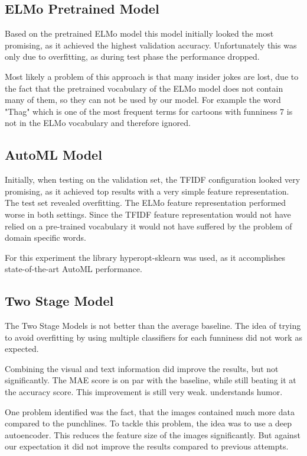 \documentclass[draft,final,oneside]{vutinfth} %
\begin{document}
\subsection{ELMo Pretrained Model}

Based on the pretrained ELMo model this model initially looked the most promising, as it
achieved the highest validation accuracy. Unfortunately this was only due to overfitting,
as during test phase the performance dropped.

Most likely a problem of this approach is that many insider jokes are lost, due to the fact
that the pretrained vocabulary of the ELMo model does not contain many of them, so
they can not be used by our model. For example the word "Thag" which is one of the most frequent terms for cartoons with funniness 7 is not in the ELMo vocabulary and therefore ignored.

\subsection{AutoML Model}
Initially, when testing on the validation set, the TFIDF configuration looked very promising, as it achieved top results with a very simple feature representation. The test set
revealed overfitting. The ELMo feature representation performed worse in both settings.
Since the TFIDF feature representation would not have relied on a pre-trained vocabulary
it would not have suffered by the problem of domain specific words.

For this experiment the library hyperopt-sklearn \cite{hyperopt} was used, as it accomplishes state-of-the-art AutoML performance.

\subsection{Two Stage Model}
The Two Stage Models is not better than the average baseline. The idea of trying to avoid overfitting by using multiple classifiers for each funniness did not work as expected.

Combining the visual and text information did improve the results, but not significantly. The MAE
score is on par with the baseline, while still beating it at the accuracy score. This improvement is still very weak.
understands humor.

One problem identified was the fact, that the images contained much more data compared to the punchlines. To tackle this problem, the idea was to use a deep autoencoder. This reduces the feature size of the images significantly. But against our expectation it did not improve the results compared to previous attempts.
\end{document}
